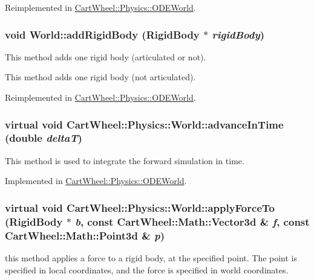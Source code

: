 Reimplemented in \hyperlink{classCartWheel_1_1Physics_1_1ODEWorld_afb5156756a0a15cc5e535f1ba405324a}{CartWheel::Physics::ODEWorld}.

\hypertarget{classCartWheel_1_1Physics_1_1World_a1ca9b7e988c6f36f136cce897d0f49d8}{
\subsubsection[{addRigidBody}]{\setlength{\rightskip}{0pt plus 5cm}void World::addRigidBody ({\bf RigidBody} $\ast$ {\em rigidBody})}}
\label{classCartWheel_1_1Physics_1_1World_a1ca9b7e988c6f36f136cce897d0f49d8}
This method adds one rigid body (articulated or not).

This method adds one rigid body (not articulated). 

Reimplemented in \hyperlink{classCartWheel_1_1Physics_1_1ODEWorld_a908e6c943e0f464135695aa4942c93d7}{CartWheel::Physics::ODEWorld}.

\hypertarget{classCartWheel_1_1Physics_1_1World_a289b113bee05b81baecebe76bc384069}{
\subsubsection[{advanceInTime}]{\setlength{\rightskip}{0pt plus 5cm}virtual void CartWheel::Physics::World::advanceInTime (double {\em deltaT})}}
\label{classCartWheel_1_1Physics_1_1World_a289b113bee05b81baecebe76bc384069}
This method is used to integrate the forward simulation in time. 

Implemented in \hyperlink{classCartWheel_1_1Physics_1_1ODEWorld_af4478f856562a7412583a788f22a7422}{CartWheel::Physics::ODEWorld}.

\hypertarget{classCartWheel_1_1Physics_1_1World_a26058e4671390ada9b3d3b1590f88f1a}{
\subsubsection[{applyForceTo}]{\setlength{\rightskip}{0pt plus 5cm}virtual void CartWheel::Physics::World::applyForceTo ({\bf RigidBody} $\ast$ {\em b}, \/  const {\bf CartWheel::Math::Vector3d} \& {\em f}, \/  const {\bf CartWheel::Math::Point3d} \& {\em p})}}
\label{classCartWheel_1_1Physics_1_1World_a26058e4671390ada9b3d3b1590f88f1a}
this method applies a force to a rigid body, at the specified point. The point is specified in local coordinates, and the force is specified in world coordinates. 

